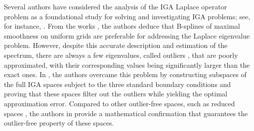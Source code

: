 \documentclass[11pt]{article}
\begin{document}
Several authors have considered the analysis of the IGA Laplace operator problem as a foundational study for solving and investigating IGA problems; see, for instance, \cite{cottrell2006isogeometric,ekstrom2018eigenvalues,garoni2019symbol,manni2022application,reali2006isogeometric}. From the works \cite{sande2019sharp,sande2020explicit}, the authors deduce that B-splines of maximal smoothness on uniform grids are preferable for addressing the Laplace eigenvalue problem. However, despite this accurate description and estimation of the spectrum, there are always a few eigenvalues, called outliers \cite{cottrell2006isogeometric}, that are poorly approximated, with their corresponding values being significantly larger than the exact ones. In \cite{manni2022application}, the authors overcame this problem by constructing subspaces of the full IGA spaces subject to the three standard boundary conditions and proving that these spaces filter out the outliers while yielding the optimal approximation error. Compared to other outlier-free spaces, such as reduced spaces \cite{hiemstra2021removal}, the authors in \cite{manni2022application} provide a mathematical confirmation that guarantees the outlier-free property of these spaces.
\end{document}
